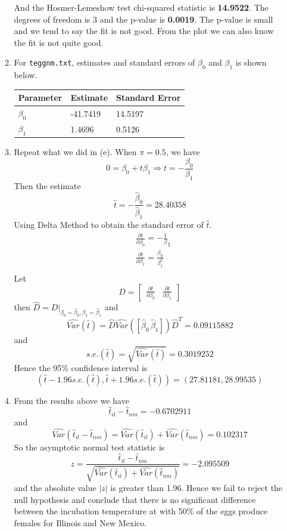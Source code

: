 \documentclass{article}
\begin{document}
\begin{enumerate}[leftmargin = 0 em, label = \arabic*., font = \bfseries]
\begin{enumerate}
	 And the Hosmer-Lemeshow test chi-squared statistic is \textbf{14.9522}. The degrees of freedom is 3 and the p-value is \textbf{0.0019}. The p-value is small and we tend to say the fit is not good. From the plot we can also know the fit is not quite good.

	 	  \item 
	 	  For \verb|teggnm.txt|, estimates and standard errors of $\beta_0$ and $\beta_1$ is shown below.
	\begin{center}
	\begin{tabular}{lll}
	\toprule
	 \textbf{Parameter} &\textbf{Estimate} &\textbf{Standard Error}\\ 
     \midrule
     $\beta_0$ &-41.7419 & 14.5197\\
     $\beta_1$ &1.4696   &0.5126\\ 
 	\bottomrule
	\end{tabular}
	\end{center}

	\item 
	Repeat what we did in (e). When $\pi = 0.5$, we have
	\[0 = \beta_0 + t \beta_1 \Rightarrow t = -\frac{\beta_0}{\beta_1}\]
	Then the estimate
	\[\hat{t} = -\frac{\hat{\beta}_0}{\hat{\beta}_1} = 28.40358\]
	Using Delta Method to obtain the standard error of $\hat{t}$.
	\begin{align*}
	 & \frac{\partial t}{\partial \beta_0} = -\frac{1}{\beta}_1\\
	 & \frac{\partial t}{\partial \beta_1} = \frac{\beta_0}{\beta_1^2}\\
	 \end{align*}
	 Let
	 \[D = \begin{bmatrix}
	 	\frac{\partial t}{\partial \beta_0} & \frac{\partial t}{\partial \beta_1}
	 \end{bmatrix}\]
	 then $\hat{D} = D|_{\beta_0= \hat{\beta}_0, \beta_1 = \hat{\beta}_1}$ and
	 \[\widehat{Var}(\hat{t}) = \hat{D}\widehat{Var}([\hat{\beta}_0\, \hat{\beta}_1])\hat{D}^T = 0.09115882\]
	 and
	 \[s.e.(\hat{t}) = \sqrt{\widehat{Var}(\hat{t})} = 0.3019252\]
	 Hence the 95\% confidence interval is
	 \[(\hat{t} - 1.96 s.e.(\hat{t}), \hat{t} + 1.96 s.e.(\hat{t})) = (27.81181, 28.99535)\]


	 \item 
	 From the results above we have
	 \[\hat{t}_{il} - \hat{t}_{nm} = -0.6702911\]
	 and
	 \[\widehat{Var}(\hat{t}_{il} - \hat{t}_{nm}) = \widehat{Var}({\hat{t}_{il}}) + \widehat{Var}(\hat{t}_{nm}) = 0.102317\]
	 So the asymptotic normal test statistic is
	 \[z = \frac{\hat{t}_{il} - \hat{t}_{nm}}{\sqrt{\widehat{Var}({\hat{t}_{il}}) + \widehat{Var}(\hat{t}_{nm})}} = -2.095509\] 
	 and the absolute value $|z|$ is greater than 1.96. Hence we fail to reject the null hypothesis and conclude that there is no significant difference between the incubation temperature at with 50\% of the eggs produce females for Illinois and New Mexico.


\end{enumerate}
\end{enumerate}
\end{document}
